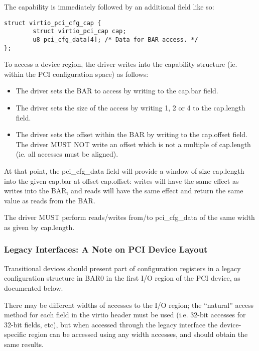 The capability is immediately followed by an additional field like so:

\begin{lstlisting}
struct virtio_pci_cfg_cap {
        struct virtio_pci_cap cap;
        u8 pci_cfg_data[4]; /* Data for BAR access. */
};
\end{lstlisting}

To access a device region, the driver writes into the capability
structure (ie. within the PCI configuration space) as follows:

\begin{itemize}
\item The driver sets the BAR to access by writing to the cap.bar field.

\item The driver sets the size of the access by writing 1, 2 or 4 to
  the cap.length field.

\item The driver sets the offset within the BAR by writing to the
  cap.offset field.  The driver MUST NOT write an offset which is not
  a multiple of cap.length (ie. all accesses must be aligned).
\end{itemize}

At that point, the pci_cfg_data field will provide a window of size
cap.length into the given cap.bar at offset cap.offset: writes will
have the same effect as writes into the BAR, and reads will have the
same effect and return the same value as reads from the BAR.

The driver MUST perform reads/writes from/to pci_cfg_data of the same
width as given by cap.length.

\subsubsection{Legacy Interfaces: A Note on PCI Device Layout}\label{sec:Virtio Transport Options / Virtio Over PCI Bus / PCI Device Layout / Legacy Interfaces: A Note on PCI Device Layout}

Transitional devices should present part of configuration
registers in a legacy configuration structure in BAR0 in the first I/O
region of the PCI device, as documented below.

There may be different widths of accesses to the I/O region; the
“natural” access method for each field in the virtio header must be
used (i.e. 32-bit accesses for 32-bit fields, etc), but 
when accessed through the legacy interface the
device-specific region can be accessed using any width accesses, and
should obtain the same results.

